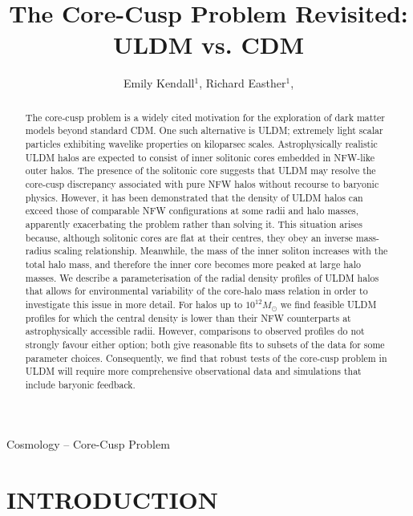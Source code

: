 \documentclass{pasa}%
\title[The Core-Cusp Problem Revisited: ULDM vs. CDM]{The Core-Cusp Problem Revisited: ULDM vs. CDM}
\author[Emily Kendall and Richard Easther]{Emily Kendall$^1$, Richard Easther$^1$, \affil{$^1$Department of Physics, University of Auckland, Private Bag 92019, Auckland, New Zealand}}%
\begin{document}
\begin{frontmatter}
\maketitle

\begin{abstract}
The core-cusp problem is a widely cited motivation for the exploration of dark matter models beyond standard CDM. One such alternative is ULDM; extremely light scalar particles exhibiting wavelike properties on kiloparsec scales.  Astrophysically realistic ULDM halos are expected to consist of inner solitonic cores embedded in NFW-like outer halos. The presence of the solitonic core suggests that ULDM may resolve the core-cusp discrepancy associated with pure NFW halos without recourse to baryonic physics. However, it has been demonstrated that the density of ULDM halos can exceed those of comparable NFW configurations at some radii and halo masses, apparently exacerbating the problem rather than solving it. This situation arises because, although solitonic cores are flat at their centres, they obey an inverse mass-radius scaling relationship. Meanwhile, the mass of the inner soliton increases with the total halo mass, and therefore the inner core becomes more peaked at large halo masses. We describe a parameterisation of the radial density profiles of ULDM halos that allows for environmental variability of the core-halo mass relation in order to investigate this issue in more detail.  For halos up to $10^{12} M_\odot$ we find feasible ULDM profiles for which the central density is lower than their NFW counterparts at astrophysically accessible radii. However, comparisons to observed profiles do not strongly favour either option; both give reasonable fits to subsets of the data for some parameter choices. Consequently, we find that robust tests of the core-cusp problem in ULDM will require more comprehensive observational data and simulations that include baryonic feedback. 

\end{abstract}

\begin{keywords}
Cosmology -- Core-Cusp Problem 
\end{keywords}
\end{frontmatter}


\section{INTRODUCTION }
\label{sec:intro}
\end{document}

